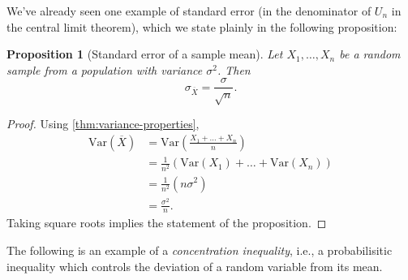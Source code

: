 \documentclass[10pt]{article}
\newtheorem{proposition}[theorem]{Proposition}
\theoremstyle{definition}
\newcommand{\1}[1]{\textbf{1}_{\left[#1\right]}} %
\def\Var{\mathrm{Var}} %
\begin{document}
We've already seen one example of standard error (in the denominator of
$U_{n}$ in the central limit theorem), which we state plainly in the following
proposition:
\begin{proposition}[Standard error of a sample mean]
  \label{prop:standard-error-sample-mean}
  Let $X_{1},\ldots,X_{n}$ be a random sample from a population with variance
  $\sigma^{2}$. Then
  \begin{equation*}
    \sigma_{\overline{X}} = \frac{\sigma}{\sqrt{n}}.
  \end{equation*}
\end{proposition}
\begin{proof}
  Using \cref{thm:variance-properties},
  \begin{align*}
    \Var(\overline{X})&= \Var \left( \frac{X_{1}+\ldots+X_{n} }{n} \right)\\ 
                      &= \frac{1}{n^{2}}\left( \Var(X_{1})+\ldots+\Var(X_{n}) \right)\\ 
                      &= \frac{1}{n^{2}} \left( n\sigma^{2} \right)\\ 
                      &= \frac{\sigma^{2}}{n}.
  \end{align*}
  Taking square roots implies the statement of the proposition.
\end{proof}

The following is an example of a \textit{concentration inequality}, i.e., a
probabilisitic inequality which controls the deviation of a random variable
from its mean.
\end{document}
